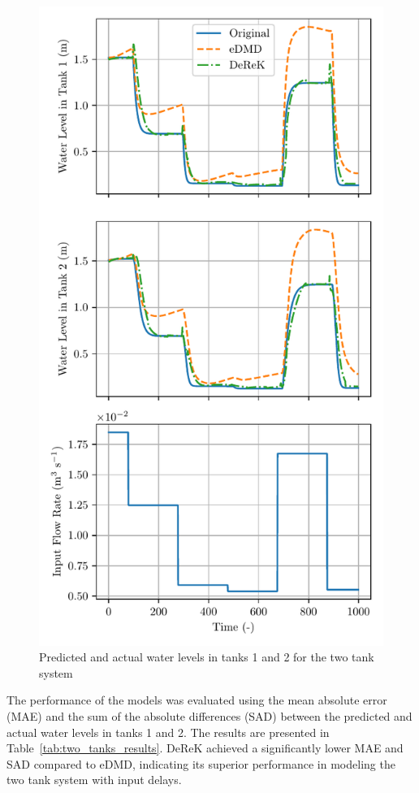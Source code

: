 \documentclass[conference]{IEEEtran}
\begin{document}
\begin{figure}[htbp]\label{fig:two_tanks_results}
    \centerline{\includegraphics[width=\linewidth]{figures/dmdc_multipred-r0-hn20-polydeg2-inv1.pdf}}
    \caption{Predicted and actual water levels in tanks 1 and 2 for the two tank system}
\end{figure}

The performance of the models was evaluated using the mean absolute error (MAE) and the sum of the absolute differences (SAD) between the predicted and actual water levels in tanks 1 and 2. The results are presented in Table~\ref{tab:two_tanks_results}. DeReK achieved a significantly lower MAE and SAD compared to eDMD, indicating its superior performance in modeling the two tank system with input delays.
\end{document}
